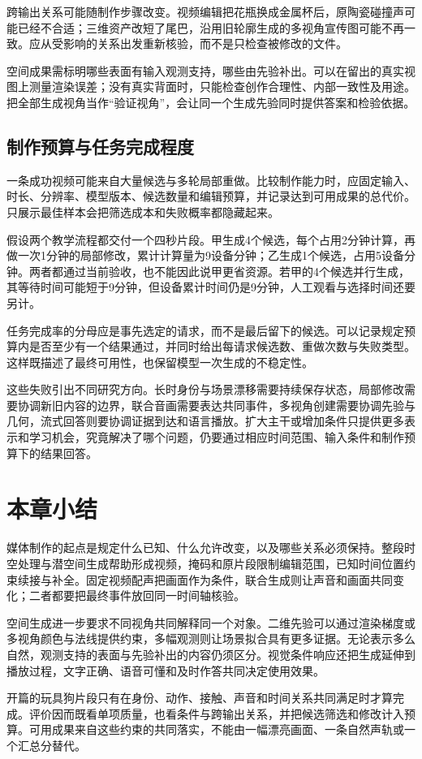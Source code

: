 跨输出关系可能随制作步骤改变。视频编辑把花瓶换成金属杯后，原陶瓷碰撞声可能已经不合适；三维资产改短了尾巴，沿用旧轮廓生成的多视角宣传图可能不再一致。应从受影响的关系出发重新核验，而不是只检查被修改的文件。

空间成果需标明哪些表面有输入观测支持，哪些由先验补出。可以在留出的真实视图上测量渲染误差；没有真实背面时，只能检查创作合理性、内部一致性及用途。把全部生成视角当作“验证视角”，会让同一个生成先验同时提供答案和检验依据。

\subsection{制作预算与任务完成程度}
\label{sec:vision-multigen-budget}

一条成功视频可能来自大量候选与多轮局部重做。比较制作能力时，应固定输入、时长、分辨率、模型版本、候选数量和编辑预算，并记录达到可用成果的总代价。只展示最佳样本会把筛选成本和失败概率都隐藏起来。

假设两个教学流程都交付一个四秒片段。甲生成4个候选，每个占用2分钟计算，再做一次1分钟的局部修改，累计计算量为9设备分钟；乙生成1个候选，占用5设备分钟。两者都通过当前验收，也不能因此说甲更省资源。若甲的4个候选并行生成，其等待时间可能短于9分钟，但设备累计时间仍是9分钟，人工观看与选择时间还要另计。

任务完成率的分母应是事先选定的请求，而不是最后留下的候选。可以记录规定预算内是否至少有一个结果通过，并同时给出每请求候选数、重做次数与失败类型。这样既描述了最终可用性，也保留模型一次生成的不稳定性。

这些失败引出不同研究方向。长时身份与场景漂移需要持续保存状态，局部修改需要协调新旧内容的边界，联合音画需要表达共同事件，多视角创建需要协调先验与几何，流式回答则要协调证据到达和语言播放。扩大主干或增加条件只提供更多表示和学习机会，究竟解决了哪个问题，仍要通过相应时间范围、输入条件和制作预算下的结果回答。

\section{本章小结}
\label{sec:vision-multigen-summary}

媒体制作的起点是规定什么已知、什么允许改变，以及哪些关系必须保持。整段时空处理与潜空间生成帮助形成视频，掩码和原片段限制编辑范围，已知时间位置约束续接与补全。固定视频配声把画面作为条件，联合生成则让声音和画面共同变化；二者都要把最终事件放回同一时间轴核验。

空间生成进一步要求不同视角共同解释同一个对象。二维先验可以通过渲染梯度或多视角颜色与法线提供约束，多幅观测则让场景拟合具有更多证据。无论表示多么自然，观测支持的表面与先验补出的内容仍须区分。视觉条件响应还把生成延伸到播放过程，文字正确、语音可懂和及时作答共同决定使用效果。

开篇的玩具狗片段只有在身份、动作、接触、声音和时间关系共同满足时才算完成。评价因而既看单项质量，也看条件与跨输出关系，并把候选筛选和修改计入预算。可用成果来自这些约束的共同落实，不能由一幅漂亮画面、一条自然声轨或一个汇总分替代。
